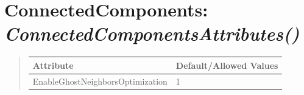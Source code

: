\documentclass[letterpaper,10pt,english]{sphinxmanual}
\begin{document}
\section{\textbf{ConnectedComponents}: \emph{ConnectedComponentsAttributes()}}
\label{attributes:connectedcomponents-connectedcomponentsattributes}
\begin{DUlineblock}{0em}
\item[] 
\end{DUlineblock}
\begin{quote}

\begin{tabulary}{\linewidth}{|L|L|}
\hline

\textbf{Attribute}
 & 
\textbf{Default/Allowed Values}
\\
\hline
EnableGhostNeighborsOptimization
 & 
1
\\
\hline\end{tabulary}

\end{quote}

\begin{DUlineblock}{0em}
\item[] 
\end{DUlineblock}

\begin{DUlineblock}{0em}
\item[] 
\end{DUlineblock}
\end{document}
